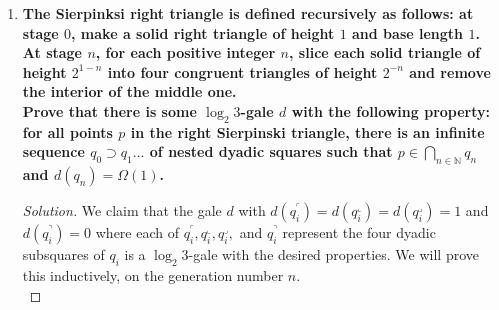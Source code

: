 \documentclass[11pt]{article}
\newenvironment{solution}
  {\renewcommand\qedsymbol{$\blacksquare$}\begin{proof}[Solution]}
  {\end{proof}}
\begin{document}
\begin{enumerate}
\begin{solution}
Consider any of the $e$ edges in our graph. Since we have completed at most $\left\lfloor\frac{e}{n}\right\rfloor + 1$ generations in our construction, each edge must have at most $\left(\left\lfloor\frac{e}{n}\right\rfloor + 1\right) - 1 = \left\lfloor\frac{e}{n}\right\rfloor$ vertices between them. Each of these vertices also has at most $\left\lfloor\frac{e}{n}\right\rfloor$ interior (not counting the boundary) edges with it as an endpoint in our $n$-gon since each generation creates one interior edge from a given vertex. Thus, the crossing number is bounded by the number of edges multiplied by the maximum number of crossings per edge:
\[ \mathrm{Cr}(G) \leq e\left( \left\lfloor\frac{e}{n}\right\rfloor \right) \left( \left\lfloor\frac{e}{n}\right\rfloor \right) = e \left( \left\lfloor\frac{e}{n}\right\rfloor \right)^2.\]

Clearly, since $\left\lfloor\frac{e}{n}\right\rfloor \leq \frac{e}{n}$, we find that
\[ \mathrm{Cr}(G) \leq e \left( \left\lfloor\frac{e}{n}\right\rfloor \right)^2 \leq e \left( \frac{e}{n}\right)^2 = \frac{e^3}{n^2}\]

as desired. 
\end{solution}

    \newpage
    
    \item \textbf{The Sierpinksi right triangle is defined recursively as follows: at stage $0$, make a solid right triangle of height $1$ and base length $1$. At stage $n$, for each positive integer $n$, slice each solid triangle of height $2^{1-n}$ into four congruent triangles of height $2^{-n}$ and remove the interior of the middle one.} \\
    
    \textbf{Prove that there is some $\log_2 3$-gale $d$ with the following property: for all points $p$ in the right Sierpinski triangle, there is an infinite sequence $q_0 \supset q_1 \dots $ of nested dyadic squares such that $p \in \bigcap_{n \in \mathbb{N}} q_n$ and $d(q_n) = \Omega(1)$.}

    \begin{solution}
    We claim that the gale $d$ with $d\left(q_{i}^{\ulcorner}\right) = d(q_{i}^{\llcorner}) = d(q_{i}^{\lrcorner}) = 1$ and $d\left(q_i^\urcorner\right) = 0$ where each of $q_{i}^{\ulcorner}, q_{i}^{\llcorner}, q_{i}^{\lrcorner},$ and $q_{i}^{\urcorner}$ represent the four dyadic subsquares of $q_i$ is a $\log_2 3$-gale with the desired properties. We will prove this inductively, on the generation number $n$. \\


\end{solution}
\end{enumerate}
\end{document}
